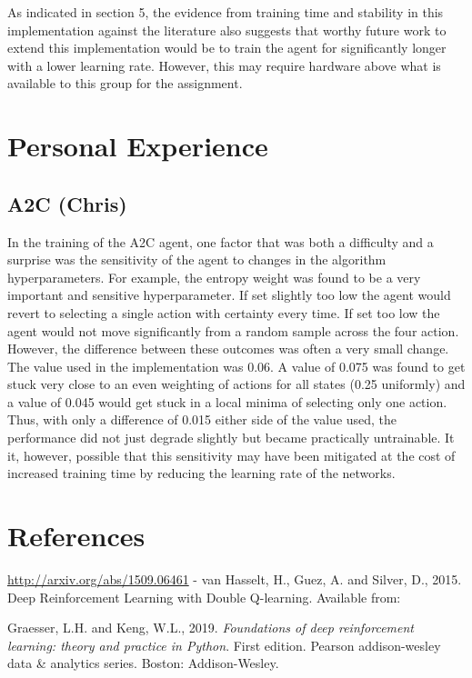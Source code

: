 \documentclass{article}
\begin{document}
As indicated in section 5, the evidence from training time and stability in this implementation against the literature also suggests that worthy future work to extend this implementation would be to train the agent for significantly longer with a lower learning rate. However, this may require hardware above what is available to this group for the assignment.

\section{Personal Experience}

\subsection{A2C (Chris)}

In the training of the A2C agent, one factor that was both a difficulty and a surprise was the sensitivity of the agent to changes in the algorithm hyperparameters. For example, the entropy weight was found to be a very important and sensitive hyperparameter. If set slightly too low the agent would revert to selecting a single action with certainty every time. If set too low the agent would not move significantly from a random sample across the four action. However, the difference between these outcomes was often a very small change. The value used in the implementation was 0.06. A value of 0.075 was found to get stuck very close to an even weighting of actions for all states (0.25 uniformly) and a value of 0.045 would get stuck in a local minima of selecting only one action. Thus, with only a difference of 0.015 either side of the value used, the performance did not just degrade slightly but became practically untrainable. It it, however, possible that this sensitivity may have been mitigated at the cost of increased training time by reducing the learning rate of the networks.

\section*{References}

\url{http://arxiv.org/abs/1509.06461} - van Hasselt, H., Guez, A. and Silver, D., 2015. Deep Reinforcement Learning with Double Q-learning. Available from: 

Graesser, L.H. and Keng, W.L., 2019. \emph{Foundations of deep reinforcement learning: theory and practice in Python}. First edition. Pearson addison-wesley data \& analytics series. Boston: Addison-Wesley.
\end{document}
